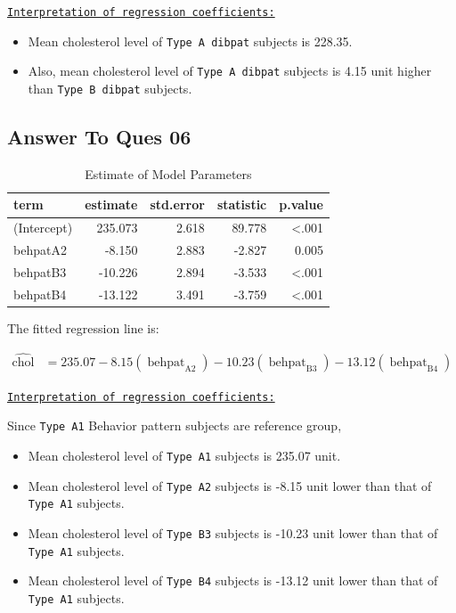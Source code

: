 \documentclass[
  12pt,
  oneside]{article}
\providecommand{\tightlist}{%
  \setlength{\itemsep}{0pt}\setlength{\parskip}{0pt}}
\begin{document}
\underline{\texttt{Interpretation of regression coefficients:}}

\begin{itemize}
\tightlist
\item
  Mean cholesterol level of \texttt{Type\ A\ dibpat} subjects is 228.35.
\item
  Also, mean cholesterol level of \texttt{Type\ A\ dibpat} subjects is 4.15 unit higher than \texttt{Type\ B\ dibpat} subjects.
\end{itemize}

\clearpage

\hypertarget{answer-to-ques-06}{%
\subsection{Answer To Ques 06}\label{answer-to-ques-06}}

\begin{table}[H]

\caption{\label{tab:Table-08}Estimate of Model Parameters}
\centering
\begin{tabular}[t]{lrrrr}
\toprule
term & estimate & std.error & statistic & p.value\\
\midrule
(Intercept) & 235.073 & 2.618 & 89.778 & <.001\\
behpatA2 & -8.150 & 2.883 & -2.827 & 0.005\\
behpatB3 & -10.226 & 2.894 & -3.533 & <.001\\
behpatB4 & -13.122 & 3.491 & -3.759 & <.001\\
\bottomrule
\end{tabular}
\end{table}

The fitted regression line is:

\begin{equation}
\label{eq: eq3}
\begin{aligned}
\operatorname{\widehat{chol}} &= 235.07 - 8.15(\operatorname{behpat}_{\operatorname{A2}}) - 10.23(\operatorname{behpat}_{\operatorname{B3}}) - 13.12(\operatorname{behpat}_{\operatorname{B4}})
\end{aligned}
\end{equation}

\underline{\texttt{Interpretation of regression coefficients:}}

Since \texttt{Type\ A1} Behavior pattern subjects are reference group,

\begin{itemize}
\tightlist
\item
  Mean cholesterol level of \texttt{Type\ A1} subjects is 235.07 unit.
\item
  Mean cholesterol level of \texttt{Type\ A2} subjects is -8.15 unit lower than that of \texttt{Type\ A1} subjects.
\item
  Mean cholesterol level of \texttt{Type\ B3} subjects is -10.23 unit lower than that of \texttt{Type\ A1} subjects.
\item
  Mean cholesterol level of \texttt{Type\ B4} subjects is -13.12 unit lower than that of \texttt{Type\ A1} subjects.
\end{itemize}
\end{document}
